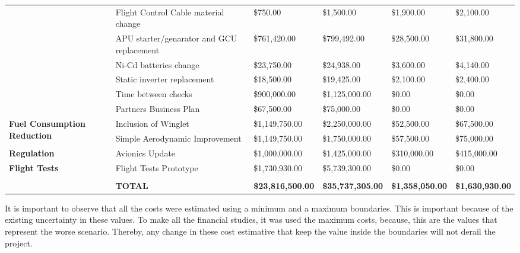 \begin{table}[H]
\begin{tabular}{| p{3cm} | p{4cm} | l | l | l | l |}
          & Flight Control Cable material change & \$750.00 & \$1,500.00 & \$1,900.00 & \$2,100.00 \\
          & APU starter/genarator and GCU replacement & \$761,420.00 & \$799,492.00 & \$28,500.00 & \$31,800.00 \\
          & Ni-Cd batteries change & \$23,750.00 & \$24,938.00 & \$3,600.00 & \$4,140.00 \\
          & Static inverter replacement & \$18,500.00 & \$19,425.00 & \$2,100.00 & \$2,400.00 \\
          & Time between checks & \$900,000.00 & \$1,125,000.00 & \$0.00 & \$0.00 \\
          & Partners Business Plan & \$67,500.00 & \$75,000.00 & \$0.00 & \$0.00 \\
    \multirow{2}[4]{*}{\textbf{Fuel Consumption Reduction}} & Inclusion of Winglet & \$1,149,750.00 & \$2,250,000.00 & \$52,500.00 & \$67,500.00 \\
          & Simple Aerodynamic Improvement & \$1,149,750.00 & \$1,750,000.00 & \$57,500.00 & \$75,000.00 \\
    \textbf{Regulation} & Avionics Update & \$1,000,000.00 & \$1,425,000.00 & \$310,000.00 & \$415,000.00 \\
    \textbf{Flight Tests} & Flight Tests Prototype & \$1,730,930.00 & \$5,739,300.00 & \$0.00 & \$0.00 \\
          &       &       &       &       &  \\
          & \textbf{TOTAL} & \textbf{\$23,816,500.00} & \textbf{\$35,737,305.00} & \textbf{\$1,358,050.00} & \textbf{\$1,630,930.00} \\
    \bottomrule
    \end{tabular}%
  \label{tab:costsCompilation}%
\end{table}%

It is important to observe that all the costs were estimated using a minimum and a maximum boundaries. This is important because of the existing uncertainty in these values. To make all the financial studies, it was used the maximum costs, because, this are the values that represent the worse scenario. Thereby, any change in these cost estimative that keep the value inside the boundaries will not derail the project.
